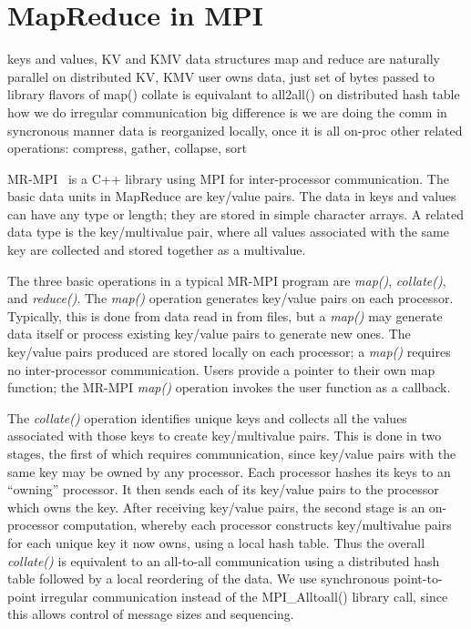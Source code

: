 \section{MapReduce in MPI}
\label{sec:mr}


  keys and values, KV and KMV data structures
  map and reduce are naturally parallel on distributed KV, KMV
    user owns data, just set of bytes passed to library
    flavors of map()
  collate is equivalant to all2all() on distributed hash table
    how we do irregular communication
  big difference is we are doing the comm in syncronous manner
    data is reorganized locally, once it is all on-proc
  other related operations: compress, gather, collapse, sort

MR-MPI~\cite{MRMPIManual} is a C++ library using MPI for
inter-processor communication.  The basic data units in MapReduce are
key/value pairs.  The data in keys and values can have any type or
length; they are stored in simple character arrays.  A related data
type is the key/multivalue pair, where all values associated with the
same key are collected and stored together as a multivalue.

The three basic operations in a typical MR-MPI program are {\it
map()}, {\it collate()}, and {\it reduce()}.  The {\it map()}
operation generates key/value pairs on each processor.  Typically,
this is done from data read in from files, but a {\it map()} may
generate data itself or process existing key/value pairs to generate
new ones.  The key/value pairs produced are stored locally on each
processor; a {\it map()} requires no inter-processor communication.
Users provide a pointer to their own map function; the MR-MPI {\it
map()} operation invokes the user function as a callback.

The {\it collate()} operation identifies unique keys and collects all
the values associated with those keys to create key/multivalue pairs.
This is done in two stages, the first of which requires communication,
since key/value pairs with the same key may be owned by any processor.
Each processor hashes its keys to an ``owning'' processor.  It then
sends each of its key/value pairs to the processor which owns the key.
After receiving key/value pairs, the second stage is an on-processor
computation, whereby each processor constructs key/multivalue pairs
for each unique key it now owns, using a local hash table.  Thus the
overall {\it collate()} is equivalent to an all-to-all communication
using a distributed hash table followed by a local reordering of the
data.  We use synchronous point-to-point irregular communication
instead of the MPI\_Alltoall() library call, since this allows control
of message sizes and sequencing.

